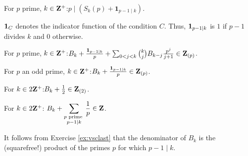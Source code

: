 \begin{prob}\label{prob:newbern0} For $p$ prime, $k\in \mathbf{Z}^{+}$:\quad $p\mid (S_k(p) + \mathbf{1}_{p-1\mid k})$.
\end{prob}
{\scriptsize $\mathbf{1}_{C}$ denotes the indicator function of the condition $C$. Thus, $\mathbf{1}_{p-1\mid k}$ is $1$ if $p-1$ divides $k$ and $0$ otherwise.}

\begin{prob}\label{prob:newbern1} For $p$ prime, $k\in \mathbf{Z}^{+}$:\quad $B_k + \frac{\mathbf{1}_{p-1\mid k}}{p} + \sum_{0 < j < k} \binom{k}{j} B_{k-j} \frac{p^j}{j+1} \in \mathbf{Z}_{(p)}$.
\end{prob}

\begin{prob}\label{prob:newbern2} For $p$ an odd prime, $k\in \mathbf{Z}^{+}$:\quad  $B_k + \frac{\mathbf{1}_{p-1\mid k}}{p} \in \mathbf{Z}_{(p)}$.
\end{prob}

\begin{prob}\label{prob:newbern3} For $k\in 2\mathbf{Z}^{+}$:\quad $B_{k} + \frac{1}{2} \in \mathbf{Z}_{(2)}$.
\end{prob}








\begin{prob}\label{ex:vsclast}\label{prob:97} For $k \in 2\mathbf{Z}^{+}$:\quad
$\displaystyle B_k + \sum_{\substack{p\text{ prime } \\ p-1 \mid k}} \frac{1}{p} \in \mathbf{Z}$.

{\scriptsize It follows from Exercise \ref{ex:vsclast} that the denominator of $B_k$ is the (squarefree!) product of the primes $p$ for which $p-1\mid k$.}
\end{prob}


